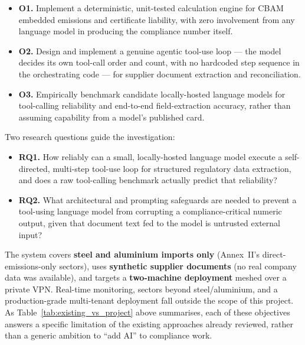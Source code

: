 \begin{itemize}[label=\textbullet]
    \item \textbf{O1.} Implement a deterministic, unit-tested calculation
    engine for CBAM embedded emissions and certificate liability, with zero
    involvement from any language model in producing the compliance number
    itself.

    \item \textbf{O2.} Design and implement a genuine agentic tool-use
    loop --- the model decides its own tool-call order and count, with no
    hardcoded step sequence in the orchestrating code --- for supplier
    document extraction and reconciliation.

    \item \textbf{O3.} Empirically benchmark candidate locally-hosted
    language models for tool-calling reliability and end-to-end
    field-extraction accuracy, rather than assuming capability from a
    model's published card.
\end{itemize}

Two research questions guide the investigation:

\begin{itemize}[label=\textbullet]
    \item \textbf{RQ1.} How reliably can a small, locally-hosted language
    model execute a self-directed, multi-step tool-use loop for structured
    regulatory data extraction, and does a raw tool-calling benchmark
    actually predict that reliability?

    \item \textbf{RQ2.} What architectural and prompting safeguards are
    needed to prevent a tool-using language model from corrupting a
    compliance-critical numeric output, given that document text fed to
    the model is untrusted external input?
\end{itemize}

The system covers \textbf{steel and aluminium imports only}
(Annex~II's direct-emissions-only sectors), uses \textbf{synthetic
supplier documents} (no real company data was available), and targets a
\textbf{two-machine deployment} meshed over a private VPN. Real-time
monitoring, sectors beyond steel/aluminium, and a production-grade
multi-tenant deployment fall outside the scope of this project. As
Table~\ref{tab:existing_vs_project} above summarises, each of these
objectives answers a specific limitation of the existing approaches
already reviewed, rather than a generic ambition to ``add AI'' to
compliance work.

